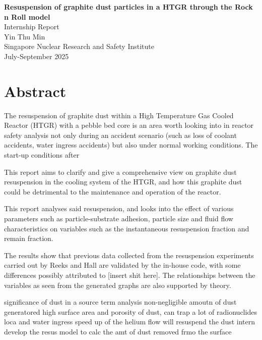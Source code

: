 \documentclass{article}
\begin{document}
\begin{titlepage}
    \centering
    \vspace*{1in} %
    {\Huge\bfseries Resuspension of graphite dust particles in a HTGR through the Rock n Roll model} \\
    \vspace{0.5in}
    {\Large Internship Report} \\
    \vspace{0.1in}
    {\Large Yin Thu Min} \\
    \vspace{0.2in}
    Singapore Nuclear Research and Safety Institute \\
    \vspace{0.5in}
    \vfill{July-September 2025}
\end{titlepage}

\tableofcontents
\clearpage


\section{Abstract}

The resuspension of graphite dust within a High Temperature Gas Cooled Reactor (HTGR) with a pebble bed core is an area worth looking into in reactor safety analysis not only during an accident scenario (such as loss of coolant accidents, water ingress accidents) but also under normal working conditions. The start-up conditions after 

This report aims to clarify and give a comprehensive view on graphite dust resuspension in the cooling system of the HTGR, and how this graphite dust could be detrimental to the maintenance and operation of the reactor. 

This report analyses said resuspension, and looks into the effect of various parameters such as particle-substrate adhesion, particle size and fluid flow characteristics on variables such as the instantaneous resuspension fraction and remain fraction. 

The results show that previous data collected from the resuspension experiments carried out by Reeks and Hall are validated by the in-house code, with some differences possibly attributed to [insert shit here]. The relationships between the variables as seen from the generated graphs are also supported by theory. 

significance of dust in a source term analysis 
non-negligible amoutn of dust generatored 
high surface area and porosity of dust, can trap a lot of radionuclides 
loca and water ingress
speed up of the helium flow will resuspend the dust 
intern develop the resus model to calc the amt of dust removed frmo the surface
\end{document}
